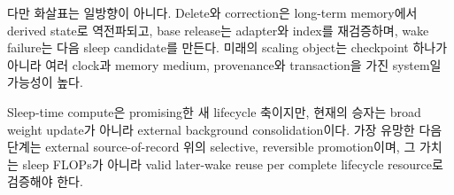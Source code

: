 다만 화살표는 일방향이 아니다. Delete와 correction은 long-term memory에서 derived state로 역전파되고,
base release는 adapter와 index를 재검증하며, wake failure는 다음 sleep candidate를 만든다. 미래의 scaling
object는 checkpoint 하나가 아니라 여러 clock과 memory medium, provenance와 transaction을 가진 system일
가능성이 높다.

\begin{keypoint}[최종 verdict]
Sleep-time compute은 promising한 새 lifecycle 축이지만, 현재의 승자는 broad weight update가 아니라
external background consolidation이다. 가장 유망한 다음 단계는 external source-of-record 위의 selective,
reversible promotion이며, 그 가치는 sleep FLOPs가 아니라 valid later-wake reuse per complete lifecycle
resource로 검증해야 한다.
\end{keypoint}
